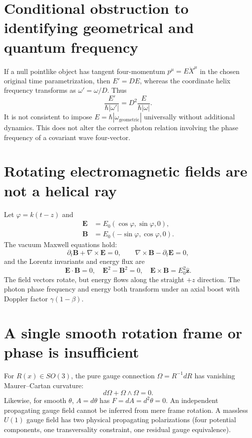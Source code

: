 \documentclass[11pt,a4paper]{article}
\begin{document}
\section{Conditional obstruction to identifying geometrical and quantum frequency}
If a null pointlike object has tangent four-momentum $p^\mu=E\dot X^\mu$ in the chosen original time parametrization, then $E'=DE$, whereas the coordinate helix frequency transforms as $\omega'=\omega/D$. Thus
\begin{equation}
\boxed{\frac{E'}{\hbar|\omega'|}=D^2\frac{E}{\hbar|\omega|}.}
\end{equation}
It is not consistent to impose $E=\hbar|\omega_{\mathrm{geometric}}|$ universally without additional dynamics. This does not alter the correct photon relation involving the phase frequency of a covariant wave four-vector.
\section{Rotating electromagnetic fields are not a helical ray}
Let $\varphi=k(t-z)$ and
\begin{align}
\mathbf E&=E_0(\cos\varphi,\sin\varphi,0),\\
\mathbf B&=E_0(-\sin\varphi,\cos\varphi,0).
\end{align}
The vacuum Maxwell equations hold:
\begin{equation}
\partial_t\mathbf B+\nabla\times\mathbf E=0,\qquad
\nabla\times\mathbf B-\partial_t\mathbf E=0,
\end{equation}
and the Lorentz invariants and energy flux are
\begin{equation}
\boxed{\mathbf E\cdot\mathbf B=0,\quad
\mathbf E^2-\mathbf B^2=0,\quad \mathbf E\times\mathbf B=E_0^2\hat{\mathbf z}.}
\end{equation}
The field vectors rotate, but energy flows along the straight $+z$ direction. The photon phase frequency and energy both transform under an axial boost with Doppler factor $\gamma(1-\beta)$.
\section{A single smooth rotation frame or phase is insufficient}
For $R(x)\in SO(3)$, the pure gauge connection $\Omega=R^{-1}dR$ has vanishing Maurer--Cartan curvature:
\begin{equation}
\boxed{d\Omega+\Omega\wedge\Omega=0.}
\end{equation}
Likewise, for smooth $\theta$, $A=d\theta$ has $F=dA=d^2\theta=0$.
An independent propagating gauge field cannot be inferred from mere frame rotation.
A massless $U(1)$ gauge field has two physical propagating polarizations (four potential components, one transversality constraint, one residual gauge equivalence).
\end{document}

